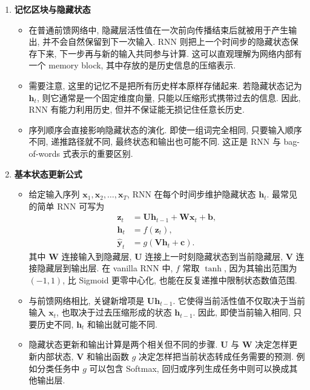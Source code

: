 \documentclass{../nndlcourse}
\begin{document}
\begin{enumerate}
  \item \textbf{记忆区块与隐藏状态}
    \begin{itemize}
      \item 在普通前馈网络中, 隐藏层活性值在一次前向传播结束后就被用于产生输出, 并不会自然保留到下一次输入. RNN 则把上一个时间步的隐藏状态保存下来, 下一步再与新的输入共同参与计算. 这可以直观理解为网络内部有一个 memory block, 其中存放的是历史信息的压缩表示.
      \item 需要注意, 这里的记忆不是把所有历史样本原样存储起来. 若隐藏状态记为 $\boldsymbol{h}_t$, 则它通常是一个固定维度向量, 只能以压缩形式携带过去的信息. 因此, RNN 有能力利用历史, 但并不保证能无损记住任意长历史.
      \item 序列顺序会直接影响隐藏状态的演化. 即使一组词完全相同, 只要输入顺序不同, 递推路径就不同, 最终状态和输出也可能不同. 这正是 RNN 与 bag-of-words 式表示的重要区别.
    \end{itemize}

  \item \textbf{基本状态更新公式}
    \begin{itemize}
      \item 给定输入序列 $\boldsymbol{x}_1,\boldsymbol{x}_2,\ldots,\boldsymbol{x}_T$, RNN 在每个时间步维护隐藏状态 $\boldsymbol{h}_t$. 最常见的简单 RNN 可写为
      \begin{align*}
        \boldsymbol{z}_t
        &= \boldsymbol{U}\boldsymbol{h}_{t-1} + \boldsymbol{W}\boldsymbol{x}_t + \boldsymbol{b}, \\
        \boldsymbol{h}_t
        &= f\left(\boldsymbol{z}_t\right), \\
        \hat{\boldsymbol{y}}_t
        &= g\left(\boldsymbol{V}\boldsymbol{h}_t + \boldsymbol{c}\right).
      \end{align*}
      其中 $\boldsymbol{W}$ 连接输入到隐藏层, $\boldsymbol{U}$ 连接上一时刻隐藏状态到当前隐藏层, $\boldsymbol{V}$ 连接隐藏层到输出层. 在 vanilla RNN 中, $f$ 常取 $\tanh$, 因为其输出范围为 $(-1,1)$, 比 Sigmoid 更零中心化, 也能在反复递推中限制状态数值范围.
      \item 与前馈网络相比, 关键新增项是 $\boldsymbol{U}\boldsymbol{h}_{t-1}$. 它使得当前活性值不仅取决于当前输入 $\boldsymbol{x}_t$, 也取决于过去压缩形成的状态 $\boldsymbol{h}_{t-1}$. 因此, 即使当前输入相同, 只要历史不同, $\boldsymbol{h}_t$ 和输出就可能不同.
      \item 隐藏状态更新和输出计算是两个相关但不同的步骤. $\boldsymbol{U}$ 与 $\boldsymbol{W}$ 决定怎样更新内部状态, $\boldsymbol{V}$ 和输出函数 $g$ 决定怎样把当前状态转成任务需要的预测. 例如分类任务中 $g$ 可以包含 Softmax, 回归或序列生成任务中则可以换成其他输出层.
    \end{itemize}


\end{enumerate}
\end{document}

